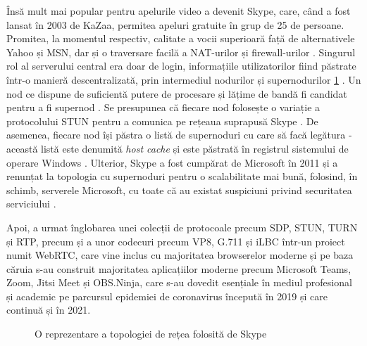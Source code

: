 \indent \par Însă mult mai popular pentru apelurile video a devenit Skype, care, când a fost lansat în 2003 de KaZaa, permitea apeluri gratuite în grup de 25 de persoane. Promitea, la momentul respectiv, calitate a vocii superioară față de alternativele Yahoo și MSN, dar și o traversare facilă a NAT-urilor și firewall-urilor \cite{Baset2004}. Singurul rol al serverului central era doar de login, informațiile utilizatorilor fiind păstrate într-o manieră descentralizată, prin intermediul nodurilor și supernodurilor \ref{SkypeNet} \cite{Baset2004}. Un nod ce dispune de suficientă putere de procesare și lățime de bandă fi candidat pentru a fi supernod \cite{Baset2004}. Se presupunea că fiecare nod folosește o variație a protocolului STUN pentru a comunica pe rețeaua suprapusă Skype \cite{Baset2004}. De asemenea, fiecare nod își păstra o listă de supernoduri cu care să facă legătura - această listă este denumită \textit{host cache} și este păstrată în registrul sistemului de operare Windows \cite{Baset2004}. Ulterior, Skype a fost cumpărat de Microsoft în 2011 și a renunțat la topologia cu supernoduri pentru o scalabilitate mai bună, folosind, în schimb, serverele Microsoft, cu toate că au existat suspiciuni privind securitatea serviciului \cite{Whittaker2013}.
\indent \par Apoi, a urmat înglobarea unei colecții de protocoale precum SDP, STUN, TURN și RTP, precum și a unor codecuri precum VP8, G.711 și iLBC într-un proiect numit WebRTC, care vine inclus cu majoritatea browserelor moderne și pe baza căruia s-au construit majoritatea aplicațiilor moderne precum Microsoft Teams, Zoom, Jitsi Meet și OBS.Ninja, care s-au dovedit esențiale în mediul profesional și academic pe parcursul epidemiei de coronavirus începută în 2019 și care continuă și în 2021.
\begin{figure}
    \centering
    \scalebox{0.65}{}
    \caption{O reprezentare a topologiei de rețea folosită de Skype}
    \label{SkypeNet}
\end{figure}